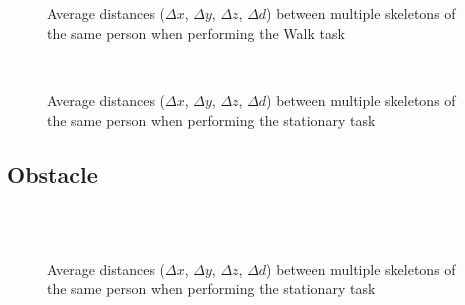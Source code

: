 \documentclass{sigchi}
\begin{document}
\begin{figure}
  \centering

  
   \\
  
   \\
  
  

  \caption{Average distances ($\Delta x$, $\Delta y$, $\Delta z$, $\Delta d$) between multiple skeletons
    of the same person when performing the Walk task}

  \label{fig:results_walk}
\end{figure}


\begin{figure}
  \centering

   \\
  

  \caption{Average distances ($\Delta x$, $\Delta y$, $\Delta z$, $\Delta d$) between multiple skeletons
    of the same person when performing the stationary task}

  \label{fig:results_walk_3d}
\end{figure}

\subsection{Obstacle}

\begin{figure}
  \centering

   \\
   \\

  \caption{Average distances ($\Delta x$, $\Delta y$, $\Delta z$, $\Delta d$) between multiple skeletons
    of the same person when performing the stationary task}

  \label{fig:results_obstacle}
\end{figure}
\end{document}
